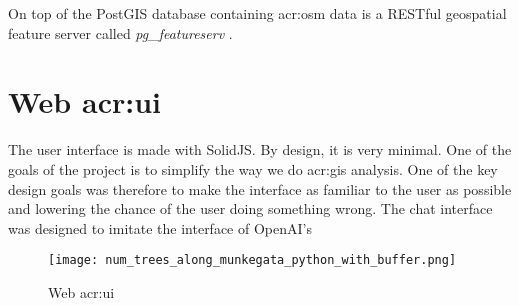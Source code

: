 On top of the PostGIS database  containing \gls{acr:osm} data is a RESTful geospatial feature server called \textit{pg\_featureserv} \citep{crunchydataCrunchyDataPg_featureserv2024}.


\section[Web UI]{Web \acrshort{acr:ui}}

The user interface is made with SolidJS. By design, it is very minimal. One of the goals of the project is to simplify the way we do \acrshort{acr:gis} analysis. One of the key design goals was therefore to make the interface as familiar to the user as possible and lowering the chance of the user doing something wrong. The chat interface was designed to imitate the interface of OpenAI's

\begin{figure}[h]
    \centering
    \texttt{[image: num\_trees\_along\_munkegata\_python\_with\_buffer.png]}
    \caption{Web \acrshort{acr:ui}}
    \label{fig:web-ui}
\end{figure}


\glsresetall

